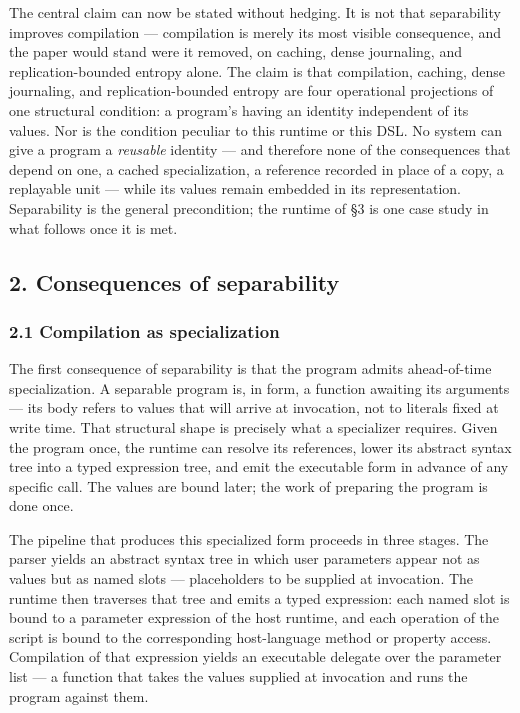 \documentclass[
]{article}
\newcounter{none} %
\begin{document}
The central claim can now be stated without hedging. It is not that
separability improves compilation --- compilation is merely its most
visible consequence, and the paper would stand were it removed, on
caching, dense journaling, and replication-bounded entropy alone. The
claim is that compilation, caching, dense journaling, and
replication-bounded entropy are four operational projections of one
structural condition: a program's having an identity independent of its
values. Nor is the condition peculiar to this runtime or this DSL. No
system can give a program a \emph{reusable} identity --- and therefore
none of the consequences that depend on one, a cached specialization, a
reference recorded in place of a copy, a replayable unit --- while its
values remain embedded in its representation. Separability is the
general precondition; the runtime of §3 is one case study in what
follows once it is met.

\subsection{2. Consequences of
separability}\label{consequences-of-separability}

\subsubsection{2.1 Compilation as
specialization}\label{compilation-as-specialization}

The first consequence of separability is that the program admits
ahead-of-time specialization. A separable program is, in form, a
function awaiting its arguments --- its body refers to values that will
arrive at invocation, not to literals fixed at write time. That
structural shape is precisely what a specializer requires. Given the
program once, the runtime can resolve its references, lower its abstract
syntax tree into a typed expression tree, and emit the executable form
in advance of any specific call. The values are bound later; the work of
preparing the program is done once.

The pipeline that produces this specialized form proceeds in three
stages. The parser yields an abstract syntax tree in which user
parameters appear not as values but as named slots --- placeholders to
be supplied at invocation. The runtime then traverses that tree and
emits a typed expression: each named slot is bound to a parameter
expression of the host runtime, and each operation of the script is
bound to the corresponding host-language method or property access.
Compilation of that expression yields an executable delegate over the
parameter list --- a function that takes the values supplied at
invocation and runs the program against them.
\end{document}
